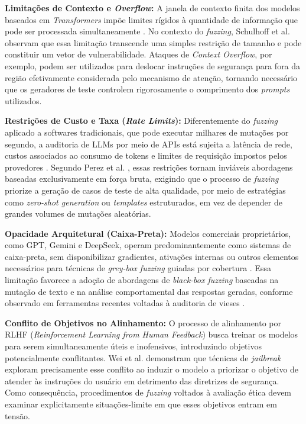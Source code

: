 \textbf{Limitações de Contexto e \textit{Overflow}:} A janela de contexto finita dos modelos baseados em \textit{Transformers} impõe limites rígidos à quantidade de informação que pode ser processada simultaneamente \cite{Zhao2025}. No contexto do \textit{fuzzing}, Schulhoff et al. \cite{Schulhoff2023} observam que essa limitação transcende uma simples restrição de tamanho e pode constituir um vetor de vulnerabilidade. Ataques de \textit{Context Overflow}, por exemplo, podem ser utilizados para deslocar instruções de segurança para fora da região efetivamente considerada pelo mecanismo de atenção, tornando necessário que os geradores de teste controlem rigorosamente o comprimento dos \textit{prompts} utilizados.

\textbf{Restrições de Custo e Taxa (\textit{Rate Limits}):} Diferentemente do \textit{fuzzing} aplicado a softwares tradicionais, que pode executar milhares de mutações por segundo, a auditoria de LLMs por meio de APIs está sujeita a latência de rede, custos associados ao consumo de tokens e limites de requisição impostos pelos provedores \cite{Perez2022}. Segundo Perez et al. \cite{Perez2022}, essas restrições tornam inviáveis abordagens baseadas exclusivamente em força bruta, exigindo que o processo de \textit{fuzzing} priorize a geração de casos de teste de alta qualidade, por meio de estratégias como \textit{zero-shot generation} ou \textit{templates} estruturados, em vez de depender de grandes volumes de mutações aleatórias.

\textbf{Opacidade Arquitetural (Caixa-Preta):} Modelos comerciais proprietários, como GPT, Gemini e DeepSeek, operam predominantemente como sistemas de caixa-preta, sem disponibilizar gradientes, ativações internas ou outros elementos necessários para técnicas de \textit{grey-box fuzzing} guiadas por cobertura \cite{Bommasani2022, Dai2024}. Essa limitação favorece a adoção de abordagens de \textit{black-box fuzzing} baseadas na mutação de texto e na análise comportamental das respostas geradas, conforme observado em ferramentas recentes voltadas à auditoria de vieses \cite{Salimian2025, Reddy2025}.

\textbf{Conflito de Objetivos no Alinhamento:} O processo de alinhamento por RLHF (\textit{Reinforcement Learning from Human Feedback}) busca treinar os modelos para serem simultaneamente úteis e inofensivos, introduzindo objetivos potencialmente conflitantes. Wei et al. \cite{Wei2023} demonstram que técnicas de \textit{jailbreak} exploram precisamente esse conflito ao induzir o modelo a priorizar o objetivo de atender às instruções do usuário em detrimento das diretrizes de segurança. Como consequência, procedimentos de \textit{fuzzing} voltados à avaliação ética devem examinar explicitamente situações-limite em que esses objetivos entram em tensão.


